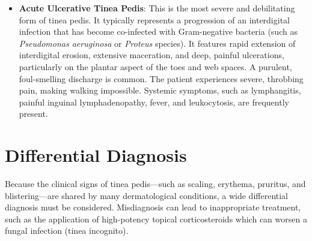 \begin{itemize}
    \item \textbf{Acute Ulcerative Tinea Pedis}: This is the most severe and debilitating form of tinea pedis. It typically represents a progression of an interdigital infection that has become co-infected with Gram-negative bacteria (such as \textit{Pseudomonas aeruginosa} or \textit{Proteus} species). It features rapid extension of interdigital erosion, extensive maceration, and deep, painful ulcerations, particularly on the plantar aspect of the toes and web spaces. A purulent, foul-smelling discharge is common. The patient experiences severe, throbbing pain, making walking impossible. Systemic symptoms, such as lymphangitis, painful inguinal lymphadenopathy, fever, and leukocytosis, are frequently present.
\end{itemize}

\section*{Differential Diagnosis}
Because the clinical signs of tinea pedis—such as scaling, erythema, pruritus, and blistering—are shared by many dermatological conditions, a wide differential diagnosis must be considered. Misdiagnosis can lead to inappropriate treatment, such as the application of high-potency topical corticosteroids which can worsen a fungal infection (tinea incognito).

